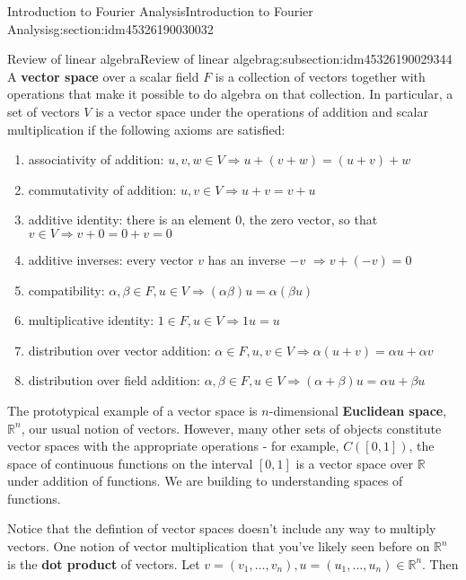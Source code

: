 \documentclass[oneside,10pt,]{article}
\newcommand{\terminology}[1]{\textbf{#1}}
\numberwithin{equation}{section}
\newcommand{\R}{\mathbb{R}}
\numberwithin{equation}{section}
\begin{document}
\begin{sectionptx}{Introduction to Fourier Analysis}{}{Introduction to Fourier Analysis}{}{}{g:section:idm45326190030032}
%
%
\typeout{************************************************}
\typeout{************************************************}
%
\begin{subsectionptx}{Review of linear algebra}{}{Review of linear algebra}{}{}{g:subsection:idm45326190029344}
A \terminology{vector space} over a scalar field \(F\) is a collection of vectors together with operations that make it possible to do algebra on that collection. In particular, a set of vectors \(V\) is a vector space under the operations of addition and scalar multiplication if the following axioms are satisfied:%
\begin{enumerate}
\item{}associativity of addition: \(u, v, w \in V \Rightarrow u+(v+w) = (u+v)+w\)%
\item{}commutativity of addition: \(u, v \in V \Rightarrow u + v = v + u\)%
\item{}additive identity: there is an element \(0\), the zero vector, so that \(v \in V \Rightarrow v + 0 = 0 + v = 0\)%
\item{}additive inverses: every vector \(v\) has an inverse \(-v\) \(\Rightarrow v + (-v) = 0\)%
\item{}compatibility: \(\alpha , \beta \in F, u \in V \Rightarrow (\alpha\beta)u = \alpha(\beta u)\)%
\item{}multiplicative identity: \(1 \in F, u \in V \Rightarrow 1u = u\)%
\item{}distribution over vector addition: \(\alpha \in F, u,v \in V \Rightarrow \alpha(u+v) = \alpha u + \alpha v\)%
\item{}distribution over field addition: \(\alpha, \beta \in F, u \in V \Rightarrow (\alpha + \beta) u = \alpha u + \beta u\)%
\end{enumerate}
The prototypical example of a vector space is \(n\)-dimensional \terminology{Euclidean space}, \(\R^n\), our usual notion of vectors. However, many other sets of objects constitute vector spaces with the appropriate operations - for example, \(C([0,1])\), the space of continuous functions on the interval \([0,1]\) is a vector space over \(\R\) under addition of functions. We are building to understanding spaces of functions.%
\par
Notice that the defintion of vector spaces doesn't include any way to multiply vectors. One notion of vector multiplication that you've likely seen before on \(\R^n\) is the \terminology{dot product} of vectors. Let \(v = (v_1, \ldots, v_n), u = (u_1, \ldots, u_n) \in \R^n\). Then%

\end{subsectionptx}
\end{sectionptx}
\end{document}
